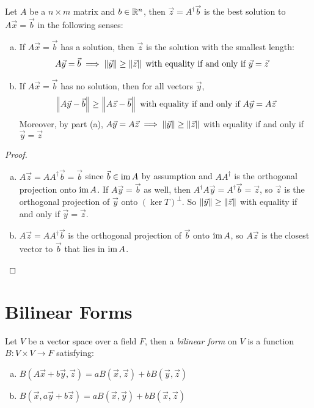\begin{theorem}
  Let $A$ be a $n \times m$ matrix and $b \in \mathbb{R}^n$, then $\vec z = A^\dagger \vec b$ is the best solution
  to $A\vec x = \vec b$ in the following senses:
  \begin{enumerate}[(a)]
    \item If $A\vec x = \vec b$ has a solution, then $\vec z$ is the solution with the smallest length:
      \begin{align}
        A\vec y = \vec b &\implies \left\lVert\vec y\right\rVert \ge \left\lVert\vec z\right\rVert \text{ with equality if and only if } \vec y = \vec z
      \end{align}
    \item If $A\vec x = \vec b$ has no solution, then for all vectors $\vec y$,
      \begin{align}
        \left\lVert A\vec y - \vec b\right\rVert \ge \left\lVert A \vec z - \vec b\right\rVert \text{ with equality if and only if } A\vec y = A\vec z
      \end{align}
      Moreover, by part (a), $A\vec y = A\vec z \implies \left\lVert\vec y\right\rVert \ge \left\lVert\vec z\right\rVert$ with equality if and only if $\vec y = \vec z$
  \end{enumerate}
\end{theorem}
\begin{proof}
  \begin{enumerate}[(a)]
    \item $A\vec z = AA^\dagger \vec b = \vec b$ since $\vec b \in \operatorname{im} A$ by assumption and $AA^\dagger$ is the orthogonal projection onto $\operatorname{im} A$.
      If $A\vec y = \vec b$ as well, then $A^\dagger A\vec y = A^\dagger\vec b = \vec z$,
      so $\vec z$ is the orthogonal projection of $\vec y$ onto $(\ker T)^\perp$.
      So $\left\lVert\vec y\right\rVert \ge \left\lVert\vec z\right\rVert$ with equality if and only if $\vec y = \vec z$.

    \item $A\vec z = AA^\dagger \vec b$ is the orthogonal projection of $\vec b$ onto $\operatorname{im} A$,
      so $A\vec z$ is the closest vector to $\vec b$ that lies in $\operatorname{im} A$.
  \end{enumerate}
\end{proof}

\section{Bilinear Forms}

\begin{definition}
  Let $V$ be a vector space over a field $F$, then a \emph{bilinear form} on $V$ is a function
  $B : V \times V \to F$ satisfying:

  \begin{enumerate}[(a)]
    \item $B(A\vec x + b\vec y, \vec z) = aB(\vec x, \vec z) + bB(\vec y, \vec z)$
    \item $B(\vec x, a\vec y + b\vec z) = aB(\vec x, \vec y) + bB(\vec x, \vec z)$
  \end{enumerate}
\end{definition}

